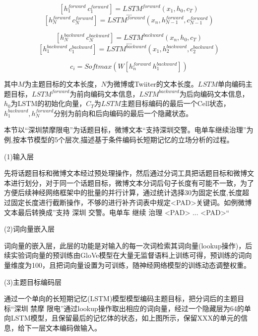 \begin{equation}\label{lstm_f}[h^{forward}_{1}~c^{forward}_{1}] = LSTM^{forward}(x_1,h_0,c_T)\end{equation}
$$...$$
\begin{equation}\label{lstm_f}[h^{forward}_{N}~c^{forward}_{N}] = LSTM^{forward}(x_n,h^{forward}_{N-1},c^{forward}_{N-1})\end{equation}

\begin{equation}\label{lstm_f}[h^{backward}_{N}~c^{backward}_{N}] = LSTM^{backward}(x_n,h_0,c_T)\end{equation}
$$...$$
\begin{equation}\label{lstm_f}[h^{backward}_{1}~c^{backward}_{1}] = LSTM^{backward}(x_1,h^{backward}_{2},c^{backward}_{2})\end{equation}

\begin{equation}\label{lstm_f}c_i=Softmax(W[h^{forward}_n~h^{backward}_1])\end{equation}

其中$M$为主题目标的文本长度，$N$为微博或Twiiter的文本长度。$LSTM$单向编码主题目标，$LSTM^{forward}$为前向编码文本信息，$LSTM^{backward}$为后向编码文本信息，$h_0$为LSTM的初始化向量，$C_T$为$LSTM$主题目标编码的最后一个Cell状态，$h^{backward}_{1},h^{forward}_{N}$分别为前向和后向编码的最后一个隐藏状态。

本节以“深圳禁摩限电”为话题目标，微博文本“支持深圳交警。电单车继续治理”为例,按本节模型的5个层次,描述基于条件编码长短期记忆的立场分析的过程。

(1)输入层

先将话题目标和微博文本经过预处理操作，然后通过分词工具把话题目标和微博文本进行划分，对于同一个话题目标，微博文本分词后句子长度有可能不一致，为了方便后续神经网络框架中的批量的并行计算，通过统计选择30为固定长度,长度超过固定长度进行截断操作，不够的进行补齐词表中规定<PAD>关键词。如例微博文本最后转换成”支持 深圳 交警。电单车 继续 治理 <PAD> ... <PAD>“

(2)词向量嵌入层

词向量的嵌入层，此层的功能是对输入的每一次词检索其词向量(lookup操作)，后续实验词向量的预训练由GloVe模型在大量无监督语料上训练可得，预训练的词向量维度为100，且把词向量设置为可训练，随神经网络模型的训练动态调整权重。

(3)主题目标编码层

通过一个单向的长短期记忆(LSTM)模型模型编码主题目标，把分词后的主题目标“深圳 禁摩 限电”通过lookup操作取出相应的词向量，经过一个隐藏层为64的单向LSTM模型，且保留最后的记忆体的状态，如上图所示，保留XXX的单元的信息，给下一层文本编码做输入。

